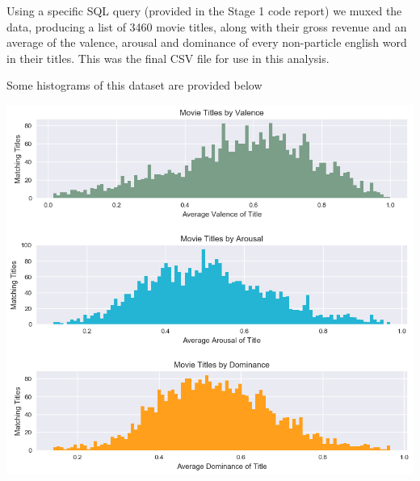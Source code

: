 \documentclass[font=10pt]{article}
\begin{document}
   Using a specific SQL query (provided in the Stage 1 code report) we muxed the data, producing a list of 3460 movie titles, along with their gross revenue and an average of the valence, arousal and dominance of every non-particle english word in their titles. This was the final CSV file for use in this analysis.

Some histograms of this dataset are provided below

\begin{center}
\includegraphics[width=15cm]{Movie_titles_by_vad.png}
\end{center}
\end{document}
